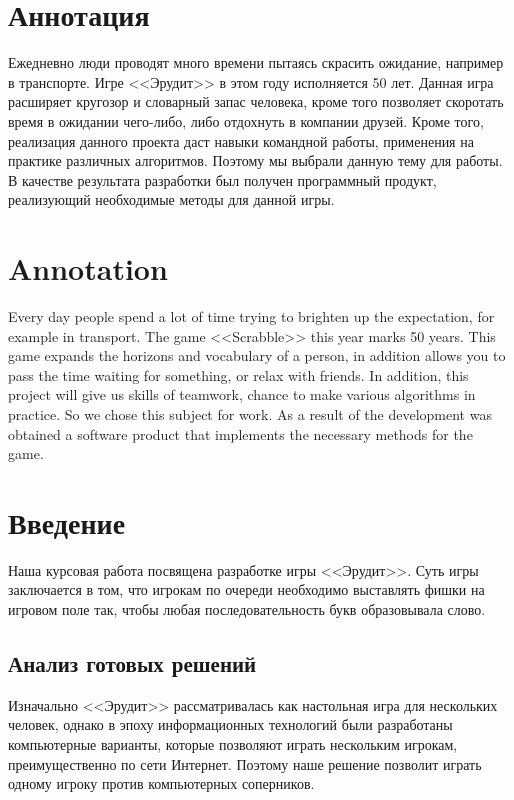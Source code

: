 \documentclass[a4paper,14pt]{article}
\begin{document}

\tableofcontents
\pagebreak
\section{Аннотация}
	Ежедневно люди проводят много времени пытаясь скрасить ожидание, например в транспорте. Игре <<Эрудит>> в этом году исполняется 50 лет. Данная игра расширяет кругозор и словарный запас человека, кроме того позволяет скоротать время в ожидании чего-либо, либо отдохнуть в компании друзей. Кроме того, реализация данного проекта даст навыки командной работы, применения на практике различных алгоритмов. Поэтому мы выбрали данную тему для работы. В качестве результата разработки был получен программный продукт, реализующий необходимые методы для данной игры.

\section*{Annotation}
Every day people spend a lot of time trying to brighten up the expectation, for example in transport. The game <<Scrabble>> this year marks 50 years. This game expands the horizons and vocabulary of a person, in addition allows you to pass the time waiting for something, or relax with friends. In addition, this project will give us skills of teamwork, chance to make various algorithms in practice. So we chose this subject for work. As a result of the development was obtained a software product that implements the necessary methods for the game.

\pagebreak

\section{Введение}
	Наша курсовая работа посвящена разработке игры <<Эрудит>>. Суть игры заключается в том, что игрокам по очереди необходимо выставлять фишки на игровом поле так, чтобы любая последовательность букв образовывала слово.
	
	\subsection{Анализ готовых решений}
	Изначально <<Эрудит>> рассматривалась как настольная игра для нескольких человек, однако в эпоху информационных технологий были разработаны компьютерные варианты, которые позволяют играть нескольким игрокам, преимущественно по сети Интернет. Поэтому наше решение позволит играть одному игроку против компьютерных соперников.
	
\end{document}
